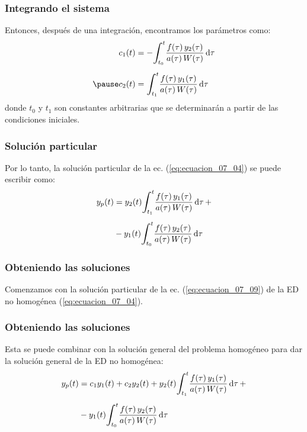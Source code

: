 \documentclass[12pt]{beamer}
\begin{document}
\begin{frame}
\frametitle{Integrando el sistema}
Entonces, después de una integración, encontramos los parámetros como:
\pause
\begin{eqnarray}
\begin{aligned}
c_{1} (t) &= - \scaleint{6ex}_{\bs t_{0}}^{t} \dfrac{f (\tau) \, y_{2} (\tau)}{a (\tau) \, W (\tau)} \dd{\tau} \\[0.5em] \pause
c_{2} (t) &= \scaleint{6ex}_{\bs t_{1}}^{t} \dfrac{f (\tau) \, y_{1} (\tau)}{a (\tau) \, W (\tau)} \dd{\tau}
\end{aligned}
\label{eq:ecuacion_07_08}
\end{eqnarray}
donde $t_{0}$ y $t_{1}$ son constantes arbitrarias que se determinarán a partir de las condiciones iniciales.
\end{frame}

\begin{frame}
\frametitle{Solución particular}
Por lo tanto, la solución particular de la ec. (\ref{eq:ecuacion_07_04}) se puede escribir como:
\pause
\begin{eqnarray}
\begin{aligned}
y_{p} (t) &= y_{2} (t) \scaleint{6ex}_{\bs t_{1}}^{t} \dfrac{f (\tau) \, y_{1} (\tau)}{a (\tau) \, W (\tau)} \dd{\tau} + \\[0.5em] 
&- y_{1} (t) \scaleint{6ex}_{\bs t_{0}}^{t} \dfrac{f (\tau) \, y_{2} (\tau)}{a (\tau) \, W (\tau)} \dd{\tau}
\end{aligned}
\label{eq:ecuacion_07_09}
\end{eqnarray}
\end{frame}

\begin{frame}
\frametitle{Obteniendo las soluciones}
Comenzamos con la solución particular de la ec. (\ref{eq:ecuacion_07_09}) de la ED no homogénea (\ref{eq:ecuacion_07_04}).
\end{frame}

\begin{frame}
\frametitle{Obteniendo las soluciones}Esta se puede combinar con la solución general del problema homogéneo para dar la solución general de la ED no homogénea:
\begin{eqnarray}
\begin{aligned}
y_{p} (t) &= c_{1} y_{1} (t) + c_{2} y_{2} (t) +  y_{2} (t) \scaleint{6ex}_{\bs t_{1}}^{t} \dfrac{f (\tau) \, y_{1} (\tau)}{a (\tau) \, W (\tau)} \dd{\tau} + \\[0.5em] 
&- y_{1} (t) \scaleint{6ex}_{\bs t_{0}}^{t} \dfrac{f (\tau) \, y_{2} (\tau)}{a (\tau) \, W (\tau)} \dd{\tau}
\label{eq:ecuacion_07_10}
\end{aligned}
\end{eqnarray}
\end{frame}
\end{document}
